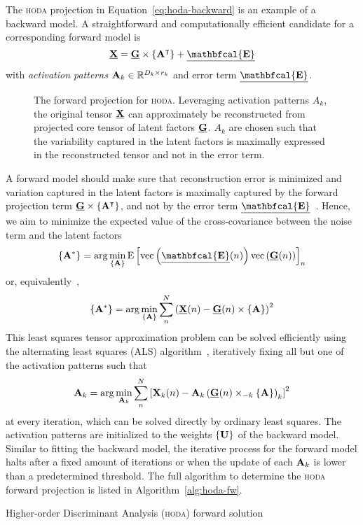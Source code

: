 \documentclass[twocolumn]{article}
\begin{document}
The \textsc{hoda} projection in Equation~\ref{eq:hoda-backward} is an example
of a backward model.
A straightforward and computationally efficient candidate for a corresponding
forward model is
\begin{equation}
	\ten{X} = \ten{G}\mmpr{\mat{A}^\intercal} + \ten{\mathbfcal{E}}
	\label{eq:hoda-forward}
\end{equation}
with \textit{activation patterns} $\mat{A}_k \in \mathbb{R}^{D_k\times r_k}$
and error term $\ten{\mathbfcal{E}}$.
\begin{figure}
	\centering
	
	\caption{The forward projection for \textsc{hoda}. Leveraging activation
		patterns $A_k$, the original tensor $\ten{X}$ can approximately be
		reconstructed from projected core tensor of latent factors $\ten{G}$. $A_k$ are chosen such
		that the variability captured in the latent factors is maximally expressed in
		the reconstructed tensor and not in the error term.}
	\label{fig:hoda-forward}
\end{figure}

A forward model should make sure that reconstruction error is minimized and
variation captured in the latent factors is maximally captured by the forward
projection term $\ten{G}\mmpr{\mat{A}^\intercal}$, and not by the error term
$\ten{\mathbfcal{E}}$~\cite{Haufe2014}.
Hence, we aim to minimize the expected value of the cross-covariance between
the noise term and the latent factors
\begin{equation}
  \left\{\mat{A}^*\right\} = \arg\min_{\{\mat{A}\}}\text{E}\left[\text{vec}\left({\ten{\mathbfcal{E}}(n)}\right)\text{vec}\left({\ten{G}(n)}\right)\right]_n
\end{equation}
or, equivalently~\cite{Parra2005,Haufe2014},
\begin{equation}
  \left\{\mat{A}^*\right\} = \arg\min_{\{\mat{A}\}}\sum_n^N\left(\ten{X}(n) - \ten{G}(n)\mmpr{\mat{A}}\right)^2
\end{equation}
This least squares tensor approximation problem can be solved efficiently using the
alternating least squares (ALS) algorithm~\cite{Comon2009},
iteratively fixing all but one of the activation patterns such that
\begin{equation}
  \mat{A}_k = \arg\min_{\mat{A}_k}
  \sum_n^N\left[\mat{X}_k(n) -
  \mat{A}_k\left(\ten{G}(n)\mmprs{\mat{A}}{k}\right)_k\right]^2
\end{equation}
at every iteration, which can be solved directly by ordinary least squares.
The activation patterns are initialized to the weights $\{\mat{U}\}$ of the
backward model.
Similar to fitting the backward model, the iterative process for the forward
model halts after a fixed amount of iterations or when the update of each
$\mat{A}_k$ is lower than a predetermined threshold.
The full algorithm to determine the \textsc{hoda} forward projection is listed
in Algorithm~\ref{alg:hoda-fw}.
\begin{algorithm}
  \caption{Higher-order Discriminant Analysis (\textsc{hoda}) forward solution}
  \label{alg:hoda-fw}
  
\end{algorithm}
\end{document}
